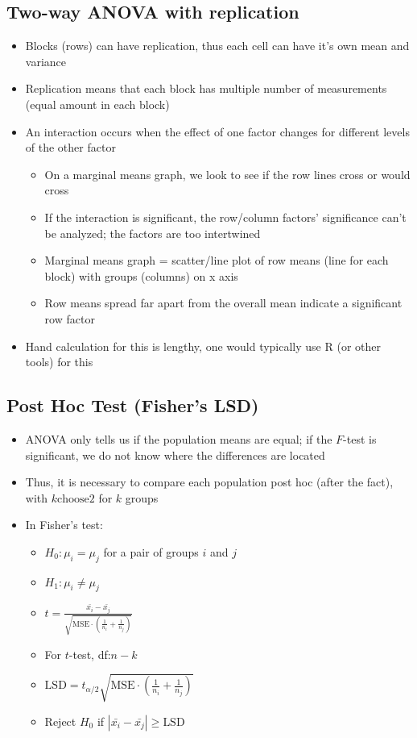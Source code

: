 \documentclass{article}
\begin{document}
\subsection{Two-way ANOVA with replication}

\begin{itemize}
    \item Blocks (rows) can have replication, thus each cell can have it's own mean and variance
    \item Replication means that each block has multiple number of measurements (equal amount in each block)
    \item An interaction occurs when the effect of one factor changes for different levels of the other factor
    \begin{itemize}
        \item On a marginal means graph, we look to see if the row lines cross or would cross
        \item If the interaction is significant, the row/column factors' significance can't be analyzed; the factors are too intertwined
        \item Marginal means graph = scatter/line plot of row means (line for each block) with groups (columns) on x axis
        \item Row means spread far apart from the overall mean indicate a significant row factor
    \end{itemize}
    \item Hand calculation for this is lengthy, one would typically use R (or other tools) for this
\end{itemize}

\subsection{Post Hoc Test (Fisher's LSD)}

\begin{itemize}
    \item ANOVA only tells us if the population means are equal; if the $F$-test is significant, we do not know where the differences are located
    \item Thus, it is necessary to compare each population post hoc (after the fact), with $k \text{choose} 2$ for $k$ groups
    \item In Fisher's test:
    \begin{itemize}
        \item $H_0: \mu_i = \mu_j$ for a pair of groups $i$ and $j$
        \item $H_1: \mu_i \ne \mu_j$ 
        \item $t = \frac{\bar{x_i}-\bar{x_j}}{\sqrt{\text{MSE} \cdot (\frac{1}{n_i} + \frac{1}{n_j})}}$
        \item For $t$-test, df:$n-k$
        \item $\text{LSD}=t_{\alpha/2}\sqrt{\text{MSE} \cdot (\frac{1}{n_i} + \frac{1}{n_j})}$
        \item Reject $H_0$ if $|\bar{x_i} - \bar{x_j}|\geq \text{LSD}$
    \end{itemize}
\end{itemize}
\end{document}
